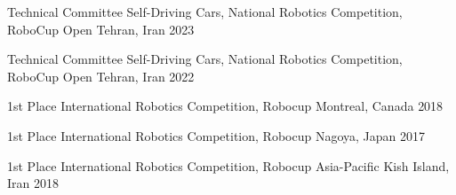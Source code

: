 




\begin{cvhonors}


\cvhonor
{Technical Committee} %
{Self-Driving Cars, National Robotics Competition, RoboCup Open} %
{Tehran, Iran} %
{2023} %


\cvhonor
{Technical Committee} %
{Self-Driving Cars, National Robotics Competition, RoboCup Open} %
{Tehran, Iran} %
{2022} %


\cvhonor
{1st Place} %
{International Robotics Competition, Robocup} %
{Montreal, Canada} %
{2018} %


\cvhonor
{1st Place} %
{International Robotics Competition, Robocup} %
{Nagoya, Japan} %
{2017} %


\cvhonor
{1st Place} %
{International Robotics Competition, Robocup Asia-Pacific} %
{Kish Island, Iran} %
{2018} %





\end{cvhonors}
